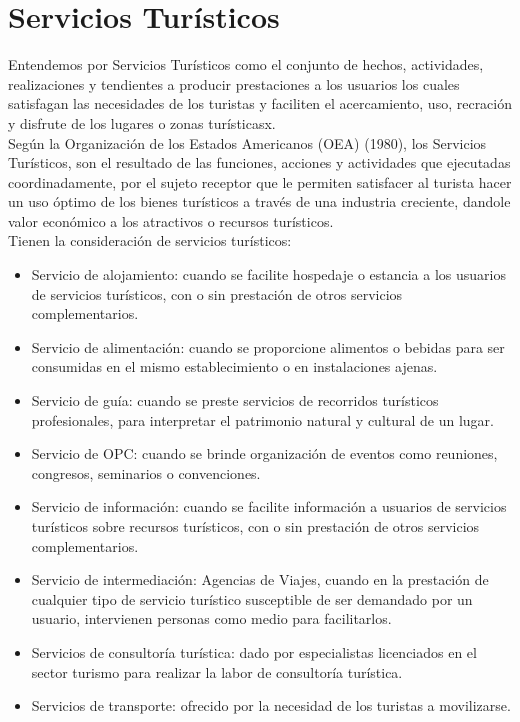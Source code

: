 \section{Servicios Turísticos}

Entendemos por Servicios Turísticos como el conjunto de hechos, actividades, realizaciones y tendientes a producir prestaciones a los usuarios los cuales   satisfagan las necesidades de los turistas y faciliten el acercamiento, uso, recración y disfrute de los lugares o zonas turísticasx\cite{ServTur}. \\ 

Según la Organización de los Estados Americanos (OEA) (1980), los Servicios Turísticos, son el  resultado de las funciones, acciones y actividades que ejecutadas coordinadamente, por el sujeto receptor que le permiten satisfacer al turista hacer un uso óptimo de los bienes turísticos a través de una industria creciente, dandole valor económico a los atractivos o recursos turísticos\cite{ServTur}.\\

Tienen la consideración de servicios turísticos\cite{ServTur}:

\begin{itemize}
	\item Servicio de alojamiento: cuando se facilite hospedaje o estancia a los usuarios de servicios turísticos, con o sin prestación de otros servicios complementarios.
	
	\item Servicio de alimentación: cuando se proporcione alimentos o bebidas para ser consumidas en el mismo establecimiento o en instalaciones ajenas.
	
	\item Servicio de guía: cuando se preste servicios de recorridos turísticos profesionales, para interpretar el patrimonio natural y cultural de un lugar.
	
	\item Servicio de OPC: cuando se brinde organización de eventos como reuniones, congresos, seminarios o convenciones.
	
	\item Servicio de información: cuando se facilite información a usuarios de servicios turísticos sobre recursos turísticos, con o sin prestación de otros servicios complementarios.
	
	\item Servicio de intermediación: Agencias de Viajes, cuando en la prestación de cualquier tipo de servicio turístico susceptible de ser demandado por un usuario, intervienen personas como medio para facilitarlos.
	
	\item Servicios de consultoría turística: dado por especialistas licenciados en el sector turismo para realizar la labor de consultoría turística.
	
	\item Servicios de transporte: ofrecido por la necesidad de los turistas a movilizarse.
	
\end{itemize}